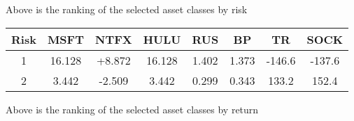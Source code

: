 \documentclass{article}
\begin{document}
Above is the ranking of the selected asset classes by risk

\vspace{1cm}


\begin{center}

\begin{tabular}{cccccccc} \toprule
    Risk & MSFT & NTFX & HULU  & RUS & BP & TR & SOCK\\ \midrule
    1  & 16.128 & +8.872 & 16.128 & 1.402 & 1.373 & -146.6 & -137.6 \\
    2  & 3.442  & -2.509 & 3.442  & 0.299 & 0.343 & 133.2  & 152.4  \\

\end{tabular}

\end{center}


Above is the ranking of the selected asset classes by return


\medskip


\end{document}
